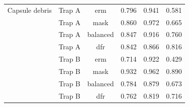 {\begin{longtable}{lccccc}
Capsule debris & Trap A & erm & 0.796 & 0.941 & 0.581 \\
 & Trap A & mask & 0.860 & 0.972 & 0.665 \\
 & Trap A & balanced & 0.847 & 0.916 & 0.760 \\
 & Trap A & dfr & 0.842 & 0.866 & 0.816 \\
 & Trap B & erm & 0.714 & 0.922 & 0.429 \\
 & Trap B & mask & 0.932 & 0.962 & 0.890 \\
 & Trap B & balanced & 0.784 & 0.879 & 0.673 \\
 & Trap B & dfr & 0.762 & 0.819 & 0.716 \\
\end{longtable}}
